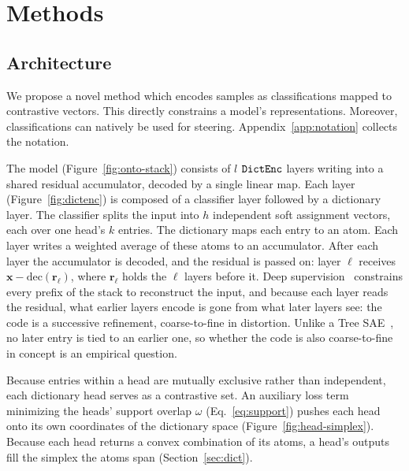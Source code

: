 \section{Methods}

\subsection{Architecture}
\label{sec:arch}
We propose a novel method which encodes samples as classifications
mapped to contrastive vectors. This directly constrains a model's
representations. Moreover, classifications can natively be used for
steering. Appendix~\ref{app:notation} collects the notation.

The model (Figure~\ref{fig:onto-stack}) consists of $l$ $\mathop{\mathtt{DictEnc}}\limits$
layers writing into a shared residual accumulator, decoded by a single
linear map. Each layer (Figure~\ref{fig:dictenc}) is composed of a
classifier layer followed by a dictionary layer. 
The classifier splits the input into $h$ independent soft assignment
vectors, each over one head's $k$ entries.
The dictionary maps each entry to an atom.
Each layer writes a weighted average of these atoms to an accumulator.
After each layer the accumulator is decoded, and the residual is passed
on: layer $\ell$ receives $\mathbf{x} - \mathrm{dec}(\mathbf{r}_\ell)$,
where $\mathbf{r}_\ell$ holds the $\ell$ layers before it.
Deep supervision~\cite{lee2015deeply} constrains every prefix of the
stack to reconstruct the input, and because each layer reads the residual,
what earlier layers encode is gone from what later layers see: the code is
a successive refinement, coarse-to-fine in distortion. Unlike a Tree
SAE~\cite{cao2026}, no later entry is tied to an earlier one, so whether
the code is also coarse-to-fine in concept is an empirical question.

Because entries within a head are mutually exclusive rather than independent,
each dictionary head serves as a contrastive set.
An auxiliary loss term minimizing the heads' support overlap $\omega$
(Eq.~\eqref{eq:support}) pushes each head onto its own coordinates of the
dictionary space (Figure~\ref{fig:head-simplex}).
Because each head returns a convex combination of its atoms, a head's
outputs fill the simplex the atoms span (Section~\ref{sec:dict}).



%
%
%
%

